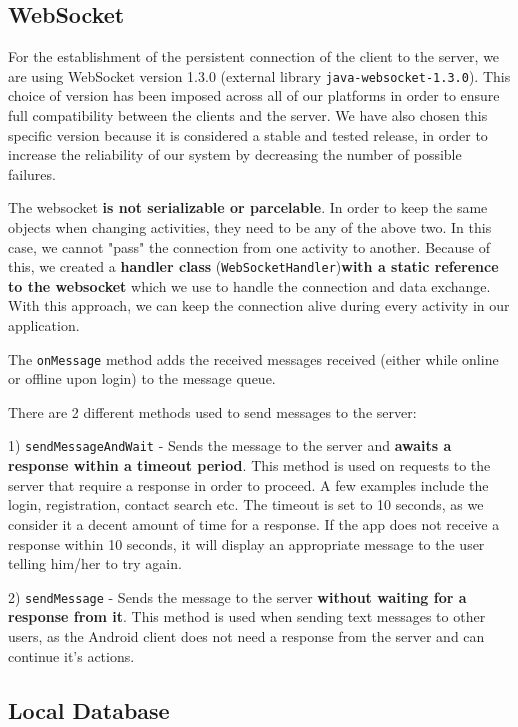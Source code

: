 \subsection{WebSocket}

For the establishment of the persistent connection of the client to the server, we are using WebSocket version 1.3.0 (external library \verb|java-websocket-1.3.0|). This choice of version has been imposed across all of our platforms in order to ensure full compatibility between the clients and the server. We have also chosen this specific version because it is considered a stable and tested release, in order to increase the reliability of our system by decreasing the number of possible failures.

The websocket \textbf{is not serializable or parcelable}. In order to keep the same objects when changing activities, they need to be any of the above two. In this case, we cannot "pass" the connection from one activity to another. Because of this, we created a \textbf{handler class} (\verb|WebSocketHandler|)\textbf{with a static reference to the websocket} which we use to handle the connection and data exchange. With this approach, we can keep the connection alive during every activity in our application.

The \verb|onMessage| method adds the received messages received (either while online or offline upon login) to the message queue.

There are 2 different methods used to send messages to the server:

1) \verb|sendMessageAndWait| - Sends the message to the server and \textbf{awaits a response within a timeout period}. This method is used on requests to the server that require a response in order to proceed. A few examples include the login, registration, contact search etc. The timeout is set to 10 seconds, as we consider it a decent amount of time for a response. If the app does not receive a response within 10 seconds, it will display an appropriate message to the user telling him/her to try again.

2) \verb|sendMessage| - Sends the message to the server \textbf{without waiting for a response from it}. This method is used when sending text messages to other users, as the Android client does not need a response from the server and can continue it's actions.

\subsection{Local Database}

